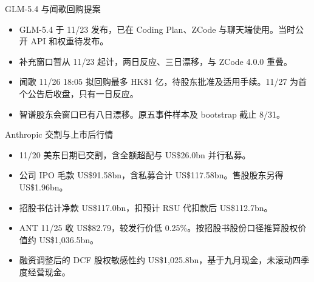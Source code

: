 \documentclass[aspectratio=169,11pt]{beamer}
\newcommand{\smallnote}[1]{\vspace{0.2em}{\footnotesize #1}}
\begin{document}
\begin{frame}{GLM-5.4 与闻歌回购提案}
  \begin{itemize}
    \item GLM-5.4 于 11/23 发布，已在 Coding Plan、ZCode 与聊天端使用。当时公开 API 和权重待发布。
    \item 补充窗口暂从 11/23 起计，两日反应、三日漂移，与 ZCode 4.0.0 重叠。
    \item 闻歌 11/26 18:05 拟回购最多 HK\$1 亿，待股东批准及适用手续。11/27 为首个公告后收盘，只有一日反应。
    \item 智谱股东会窗口已有八日漂移。原五事件样本及 bootstrap 截止 8/31。
  \end{itemize}
  \smallnote{来源：Z.ai、ZCode、香港交易所。}
\end{frame}
\begin{frame}{Anthropic 交割与上市后行情}
  \begin{itemize}
    \item 11/20 美东日期已交割，含全额超配与 US\$26.0bn 并行私募。
    \item 公司 IPO 毛款 US\$91.58bn，含私募合计 US\$117.58bn。售股股东另得 US\$1.96bn。
    \item 招股书估计净款 US\$117.0bn，扣预计 RSU 代扣款后 US\$112.7bn。
    \item ANT 11/25 收 US\$82.79，较发行价低 0.25\%。按招股书股份口径推算股权价值约 US\$1,036.5bn。
    \item 融资调整后的 DCF 股权敏感性约 US\$1,025.8bn，基于九月现金，未滚动四季度经营现金。
  \end{itemize}
  \smallnote{来源：Form 8-K、正式招股书、Nasdaq。}
\end{frame}
\end{document}
